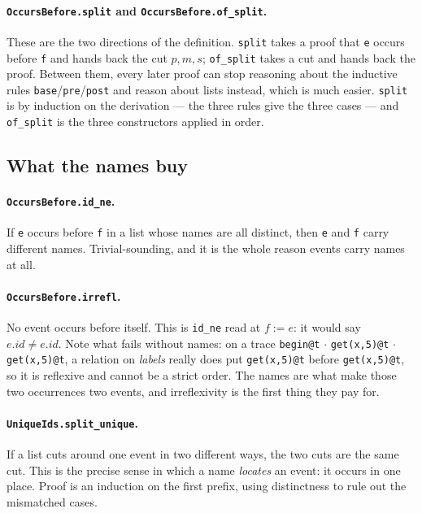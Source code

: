 \documentclass[11pt]{article}
\newcommand{\lean}[1]{\texttt{\small #1}}
\begin{document}
\paragraph{\lean{OccursBefore.split} and \lean{OccursBefore.of\_split}.}
These are the two directions of the definition. \lean{split} takes a proof that
\lean{e} occurs before \lean{f} and hands back the cut $p, m, s$; \lean{of\_split}
takes a cut and hands back the proof. Between them, every later proof can stop
reasoning about the inductive rules \lean{base}/\lean{pre}/\lean{post} and reason
about lists instead, which is much easier. \lean{split} is by induction on the
derivation --- the three rules give the three cases --- and \lean{of\_split} is
the three constructors applied in order.

\subsection{What the names buy}

\paragraph{\lean{OccursBefore.id\_ne}.}
If \lean{e} occurs before \lean{f} in a list whose names are all distinct, then
\lean{e} and \lean{f} carry different names. Trivial-sounding, and it is the
whole reason events carry names at all.

\paragraph{\lean{OccursBefore.irrefl}.}
No event occurs before itself. This is \lean{id\_ne} read at $f := e$: it would
say $e.id \neq e.id$. Note what fails without names: on a trace
\lean{begin@t} $\cdot$ \lean{get(x,5)@t} $\cdot$ \lean{get(x,5)@t}, a relation on
\emph{labels} really does put \lean{get(x,5)@t} before \lean{get(x,5)@t}, so it
is reflexive and cannot be a strict order. The names are what make those two
occurrences two events, and irreflexivity is the first thing they pay for.

\paragraph{\lean{UniqueIds.split\_unique}.}
If a list cuts around one event in two different ways, the two cuts are the same
cut. This is the precise sense in which a name \emph{locates} an event: it occurs
in one place. Proof is an induction on the first prefix, using distinctness to
rule out the mismatched cases.
\end{document}
